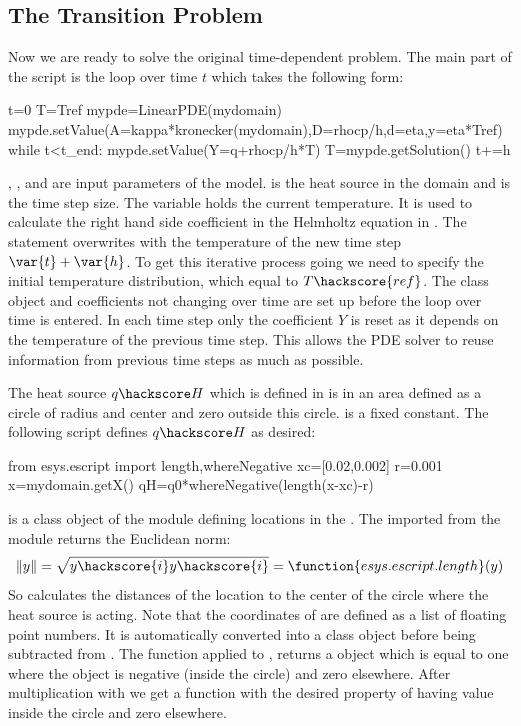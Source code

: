 \subsection{The Transition Problem}
\label{DIFFUSION TRANS SEC}
Now we are ready to solve the original time-dependent problem. The main 
part of the script is the loop over time $t$ which takes the following form:
\begin{python}
t=0
T=Tref
mypde=LinearPDE(mydomain)
mypde.setValue(A=kappa*kronecker(mydomain),D=rhocp/h,d=eta,y=eta*Tref)
while t<t_end:
      mypde.setValue(Y=q+rhocp/h*T)
      T=mypde.getSolution()
      t+=h
\end{python}
, ,  and  are input parameters of the model.  is the heat source
in the domain and  is the time step size.
The variable 
holds the current temperature. It is used to calculate the right hand side coefficient  in the
Helmholtz equation in . The statement  overwrites  with the 
temperature of the new time step $\var{t}+\var{h}$. To get this iterative process going we need to specify the
initial temperature distribution, which equal to $T\hackscore{ref}$.
The \LinearPDE class object 
and coefficients not changing over time are set up before the loop over time is entered. In each time step only the coefficient
$Y$ is reset as it depends on the temperature of the previous time step. This allows the PDE solver to reuse information 
from previous time steps as much as possible.

The heat source $q\hackscore H$ which is defined in  is 
in an area defined as a circle of radius  and center  and zero outside this circle.
 is a fixed constant. The following script defines $q\hackscore H$ as desired:  
\begin{python}
from esys.escript import length,whereNegative
xc=[0.02,0.002]
r=0.001
x=mydomain.getX()
qH=q0*whereNegative(length(x-xc)-r)
\end{python}
 is a \Data class object of
the \escript module defining locations in the \Domain {}.
The  imported from the \escript module returns the 
Euclidean norm:
\begin{equation}\label{DIFFUSION HELM EQ 3aba}
\|y\|=\sqrt{
y\hackscore{i}
y\hackscore{i}
} = \function{esys.escript.length}(y)
\end{equation}
So  calculates the distances  
of the location  to the center of the circle  where the heat source is acting.
Note that the coordinates of  are defined as a list of floating point numbers. It is automatically
converted into a \Data class object before being subtracted from . The function  
applied to
, returns a \Data object which is equal to one where the object is negative (inside the circle) and
zero elsewhere. After multiplication with  we get a function with the desired property of having value  inside
the circle and zero elsewhere.


